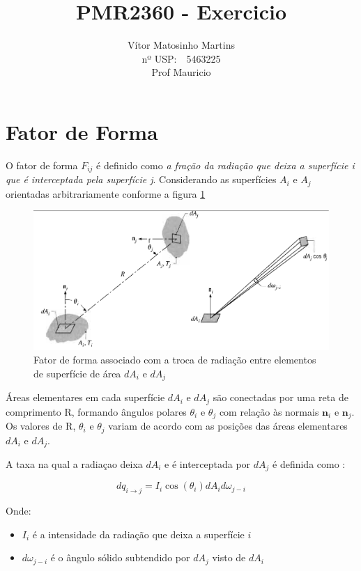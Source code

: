 \documentclass[12pt,a4paper]{article}
\title{PMR2360 - Exercicio}
\author{Vítor Matosinho Martins \\ 
nº USP:\ \ 5463225 \\
Prof Mauricio}
\begin{document}
\maketitle

\section{Fator de Forma}
O fator de forma $F_{ij}$ é definido como \textit{ a fração da radiação que deixa a superfície i que é interceptada pela superfície j}. Considerando as superfícies $A_{i}$ e $A_{j}$ orientadas arbitrariamente conforme a figura \ref{fig:2}

\begin{figure}[h]
\begin{center}
\includegraphics[scale=.35]{./fig/2.png}
\caption{\label{fig:2}Fator de forma associado com a troca de radiação entre elementos de superfície de área $dA_{i}$ e $dA_{j}$}
\end{center}
\end{figure}

Áreas elementares em cada superfície $dA_{i}$ e $dA_{j}$ são conectadas por uma reta de comprimento R, formando ângulos polares $\theta _{i}$ e $\theta _{j}$ com relação às normais $\textbf{n}_{i}$ e $\textbf{n}_{j}$. Os valores de R, $\theta _{i}$ e $\theta _{j}$ variam de acordo com as posições das áreas elementares $dA_{i}$ e $dA_{j}$.

A taxa na qual a radiaçao deixa $dA_{i}$ e é interceptada por $dA_{j}$ é definida como :

\[dq_{i \rightarrow j} = I_{i}\cos(\theta _{i})dA_{i}d\omega _{j-i}\]

Onde:
\begin{itemize}
\item $I_{i}$ é a intensidade da radiação que deixa a superfície $i$
\item $d\omega _{j-i}$ é o ângulo sólido subtendido por $dA_{j}$ visto de $dA_{i}$
\end{itemize}
\end{document}
